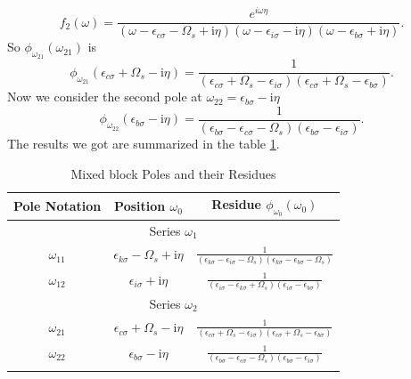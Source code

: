 \documentclass[12pt]{caltech_thesis}
\begin{document}
\begin{equation}
f_2(\omega) = \frac{e^{i\omega \eta }}{(\omega-\epsilon_{c \sigma}-\Omega_s+\mathrm{i} \eta)(\omega-\epsilon_{i \sigma}-\mathrm{i} \eta)(\omega-\epsilon_{b \sigma}+\mathrm{i} \eta)}.
\end{equation}
So $\phi_{\omega_{21}}(\omega _{21})$ is
\begin{equation}
{\phi_{\omega_{21}}(\epsilon_{c \sigma} + \Omega_s - \mathrm{i} \eta) = \frac{1}{(\epsilon_{c \sigma} + \Omega_s -\epsilon_{i \sigma})(\epsilon_{c \sigma} + \Omega_s -\epsilon_{b \sigma})}}.
\end{equation}
Now we consider the second pole at $\omega_{22} = \epsilon _{b \sigma } - \mathrm{i} \eta$
\begin{equation}
{\phi_{\omega_{22}}(\epsilon_{b \sigma} - \mathrm{i} \eta) = \frac{1}{(\epsilon_{b \sigma} -\epsilon_{c \sigma}-\Omega_s)(\epsilon_{b \sigma} -\epsilon_{i \sigma})}}.
\end{equation}
The results we got are summarized in the table \ref{tabpoles_residues_mixed}.\\
\begin{table}[h]
\centering
\caption{Mixed block Poles and their Residues}
\begin{tabular}{|c|c|c|}
\hline
Pole Notation & Position $\omega_0$ & Residue $\phi_{\omega_0}(\omega_0)$ \\
\hline
\multicolumn{3}{|c|}{Series $\omega_1$} \\
\hline
$\omega_{11}$ & $\epsilon_{k \sigma} - \Omega_s + \mathrm{i} \eta$ & $\frac{1}{(\epsilon_{k \sigma} -\epsilon_{i \sigma}-\Omega_s)(\epsilon_{k \sigma} -\epsilon_{b \sigma}-\Omega_s)}$ \\
$\omega_{12}$ & $\epsilon_{i \sigma} + \mathrm{i} \eta$ & $\frac{1}{(\epsilon_{i \sigma} -\epsilon_{k \sigma}+\Omega_s)(\epsilon_{i \sigma} -\epsilon_{b \sigma})}$ \\
\hline
\multicolumn{3}{|c|}{Series $\omega_2$} \\
\hline
$\omega_{21}$ & $\epsilon_{c \sigma} + \Omega_s - \mathrm{i} \eta$ & $\frac{1}{(\epsilon_{c \sigma} + \Omega_s -\epsilon_{i \sigma})(\epsilon_{c \sigma} + \Omega_s -\epsilon_{b \sigma})}$ \\
$\omega_{22}$ & $\epsilon_{b \sigma} - \mathrm{i} \eta$ & $\frac{1}{(\epsilon_{b \sigma} -\epsilon_{c \sigma}-\Omega_s)(\epsilon_{b \sigma} -\epsilon_{i \sigma})}$ \\
\hline
\label{tabpoles_residues_mixed}
\end{tabular}
\end{table}
\end{document}
